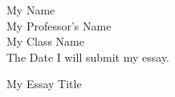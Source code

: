 \documentclass[12pt]{article}
\begin{document}
{\noindent
My Name \\
My Professor’s Name \\
My Class Name \\
The Date I will submit my essay.\\
}

\vspace{1cm}

\begin{center}
    My Essay Title
\end{center}

\thispagestyle{empty}  %

\lipsum[1-5] %
\end{document}
